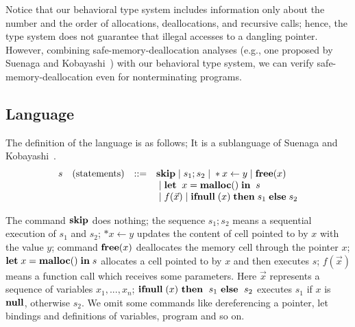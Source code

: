 \documentclass{sigplanconf}
\begin{document}
Notice that our behavioral type system includes information only about
the number and the order of allocations, deallocations, and recursive
calls; hence, the type system does not guarantee that illegal accesses
to a dangling pointer.  However, combining safe-memory-deallocation
analyses (e.g., one proposed by Suenaga and
Kobayashi~\cite{DBLP:conf/aplas/SuenagaK09}) with our behavioral type
system, we can verify safe-memory-deallocation even for nonterminating
programs.

\subsection{Language}
The definition of the language is as follows; It
is a sublanguage of Suenaga and Kobayashi~\cite{DBLP:conf/aplas/SuenagaK09}.
\[
\begin{array}{rlcl}
  s & (\mbox{statements})&::=&\mathbf{skip} \;|\; s_{1};s_{2} \;|\; *x \leftarrow y \;|\; \mathbf{free} (x) \\
  & & & \;|\; \mathbf{let}\;\; x = \mathbf{malloc()} \; \mathbf{in}\; \; s  \\
  & &  & \;|\; f(\vec{x}) \;|\; \mathbf{ifnull}\;(x) \; \mathbf{then}\; s_{1}\; \mathbf{else}\; s_{2} \\
\end{array}
\]


The command $\mathbf{skip}$ does nothing; the sequence $s_{1};s_{2}$ means a
sequential execution of $s_{1}$ and $s_{2}$; \(*x \leftarrow y\)
updates the content of cell pointed to by \(x\) with the value \(y\);
command $\mathbf{free}(x)$ deallocates the memory cell through the pointer
$x$; \(\mathbf{let}\; x = \mathbf{malloc()} \; \mathbf{in}\; s\) allocates a cell pointed to by
\(x\) and then executes \(s\); $f(\vec{x})$ means a function call
which receives some parameters. Here $\vec{x}$ represents a sequence
of variables \(x_1,...,x_n\); \(\mathbf{ifnull}\;(x)\ \mathbf{then}\;\ s_1\ \mathbf{else}\;\ s_2\)
executes \(s_1\) if \(x\) is \(\mathbf{null}\), otherwise \(s_2\). We omit
some commands like dereferencing a pointer, let bindings and
definitions of variables, program and so on.
\end{document}
